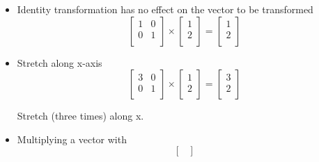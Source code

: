 \begin{itemize}
  \item Identity transformation has no effect on the vector to be transformed
    \[
      \begin{bmatrix}
        1 & 0 \\
        0 & 1 \\
      \end{bmatrix}
      \times
      \begin{bmatrix}
        1 \\
        2 \\
      \end{bmatrix}
      =
      \begin{bmatrix}
        1 \\
        2 \\
      \end{bmatrix}
    \]
  \item Stretch along x-axis
    \[
      \begin{bmatrix}
        3 & 0 \\
        0 & 1 \\
      \end{bmatrix}
      \times
      \begin{bmatrix}
        1 \\
        2 \\
      \end{bmatrix}
      =
      \begin{bmatrix}
        3 \\
        2 \\
      \end{bmatrix}
    \]
  \begin{marginfigure}
    \caption{Stretch (three times) along x.}
  \end{marginfigure}
  \item Multiplying a vector with
    \[
        \begin{bmatrix}

\end{bmatrix}\]
\end{itemize}
